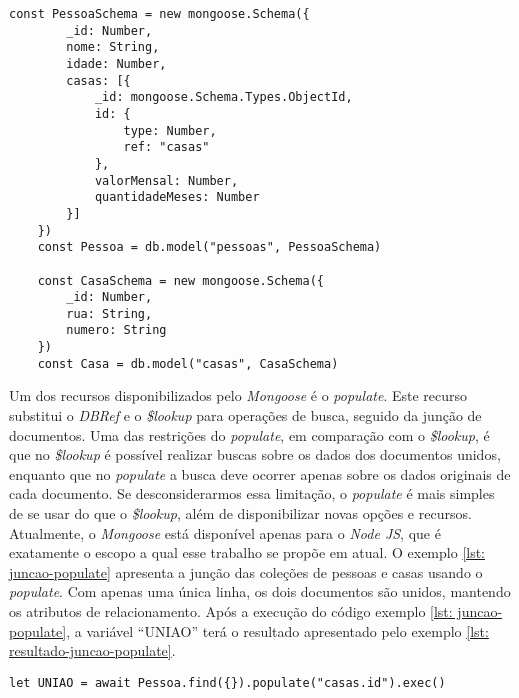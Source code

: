 
\begin{lstlisting}[style=ES6, caption={Definição de \textit{Schemas} no \textit{Mongoose}\label{lst: schema-mongoose}}]
    const PessoaSchema = new mongoose.Schema({
        _id: Number,
        nome: String,
        idade: Number,
        casas: [{
            _id: mongoose.Schema.Types.ObjectId,
            id: {
                type: Number,
                ref: "casas"
            },
            valorMensal: Number,
            quantidadeMeses: Number
        }]
    })
    const Pessoa = db.model("pessoas", PessoaSchema)

    const CasaSchema = new mongoose.Schema({
        _id: Number,
        rua: String,
        numero: String
    })
    const Casa = db.model("casas", CasaSchema)
\end{lstlisting}

Um dos recursos disponibilizados pelo \textit{Mongoose} é o \textit{populate}. Este recurso substitui o \textit{DBRef} e o \textit{\$lookup} para operações de busca, seguido da junção de documentos. Uma das restrições do \textit{populate}, em comparação com o \textit{\$lookup}, é que no \textit{\$lookup} é possível realizar buscas sobre os dados dos documentos unidos, enquanto que no \textit{populate} a busca deve ocorrer apenas sobre os dados originais de cada documento. Se desconsiderarmos essa limitação, o \textit{populate} é mais simples de se usar do que o \textit{\$lookup}, além de disponibilizar novas opções e recursos. Atualmente, o \textit{Mongoose} está disponível apenas para o \textit{Node JS}, que é exatamente o escopo a qual esse trabalho se propõe em atual. O exemplo \ref{lst: juncao-populate} apresenta a junção das coleções de pessoas e casas usando o \textit{populate}. Com apenas uma única linha, os dois documentos são unidos, mantendo os atributos de relacionamento. Após a execução do código exemplo \ref{lst: juncao-populate}, a variável ``UNIAO'' terá o resultado apresentado pelo exemplo \ref{lst: resultado-juncao-populate}.

\begin{lstlisting}[style=ES6, caption={Junção de Documentos Com o \textit{Populate}\label{lst: juncao-populate}}]
  let UNIAO = await Pessoa.find({}).populate("casas.id").exec()
\end{lstlisting}

